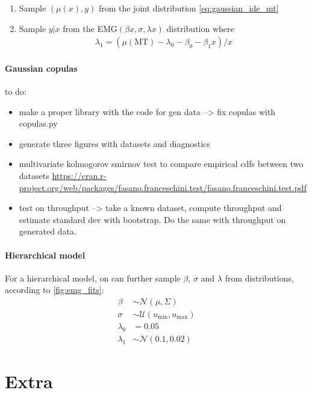 \documentclass[12pt,a4paper]{article}
\begin{document}
\begin{enumerate}
	\item Sample $(\mu(x),y)$ from the joint distribution \autoref{eq:gaussian_ide_mt}
	\item Sample $y|x$ from the EMG$(\beta x, \sigma, \lambda x)$ distribution where \begin{align}
		      \lambda_1 = (\mu(\text{MT}) - \lambda_0 - \beta_0 - \beta_1 x)/x
	      \end{align}
\end{enumerate}

\paragraph{Gaussian copulas}
to do:
\begin{itemize}
	\item make a proper library with the code for gen data --> fix copulas with copulas.py
	\item generate three figures with datasets and diagnostics
	\item multivariate kolmogorov smirnov test to compare empirical cdfs between two datasets \url{https://cran.r-project.org/web/packages/fasano.franceschini.test/fasano.franceschini.test.pdf}
	\item test on throughput --> take a known dataset, compute throughput and estimate standard dev with bootstrap. Do the same with throughput on generated data.
\end{itemize}

\paragraph{Hierarchical model}  For a hierarchical model, on can further sample $\beta$, $\sigma$ and $\lambda$ from distributions, according to \autoref{fig:emg_fits}:
\begin{align}
	\beta     & \sim \mathcal{N}(\mu, \Sigma)                    \\
	\sigma    & \sim \mathcal{U}(u_{\text{min}}, u_{\text{max}}) \\
	\lambda_0 & = 0.05                                           \\
	\lambda_1 & \sim \mathcal{N}(0.1, 0.02)
\end{align}





\section{Extra}
\end{document}
